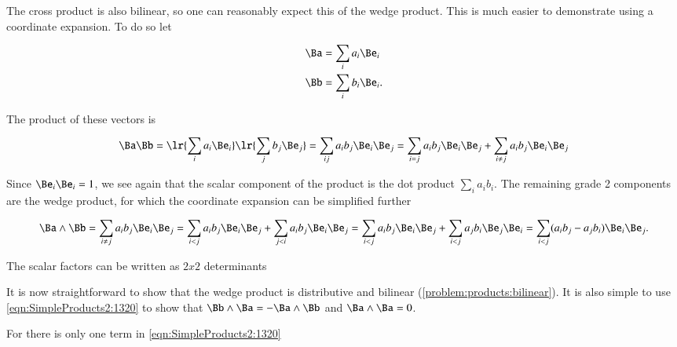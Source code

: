 The cross product is also bilinear, so one can reasonably expect this of the wedge product.  This is much easier to demonstrate using a coordinate expansion.  To do so let

\begin{dmath}\label{eqn:SimpleProducts2:1160}
\begin{aligned}
\Ba &= \sum_i a_i \Be_i \\
\Bb &= \sum_i b_i \Be_i.
\end{aligned}
\end{dmath}

The product of these vectors is

\begin{dmath}\label{eqn:SimpleProducts2:1360}
\Ba \Bb
=
\lr{ \sum_i a_i \Be_i } \lr{ \sum_j b_j \Be_j }
=
\sum_{ij} a_i b_j \Be_i \Be_j
=
\sum_{i = j} a_i b_j \Be_i \Be_j
+
\sum_{i \ne j} a_i b_j \Be_i \Be_j
\end{dmath}

Since \( \Be_i \Be_i = 1 \), we see again that the scalar component of the product is the dot product \( \sum_i a_i b_i \).  The remaining grade 2 components are the wedge product, for which the coordinate expansion can be simplified further

\begin{dmath}\label{eqn:SimpleProducts2:1460}
\Ba \wedge \Bb
=
\sum_{i \ne j} a_i b_j \Be_i \Be_j
=
\sum_{i < j} a_i b_j \Be_i \Be_j
+
\sum_{j < i} a_i b_j \Be_i \Be_j
=
\sum_{i < j} a_i b_j \Be_i \Be_j
+
\sum_{i < j} a_j b_i \Be_j \Be_i
=
\sum_{i < j} (a_i b_j - a_j b_i) \Be_i \Be_j.
\end{dmath}

The scalar factors can be written as \( 2 x 2 \) determinants


It is now straightforward to show that the wedge product is distributive and bilinear (\cref{problem:products:bilinear}).  It is also simple to use \cref{eqn:SimpleProducts2:1320} to show that \( \Bb \wedge \Ba = -\Ba \wedge \Bb \) and \( \Ba \wedge \Ba = 0 \).

For  there is only one term in \cref{eqn:SimpleProducts2:1320}

